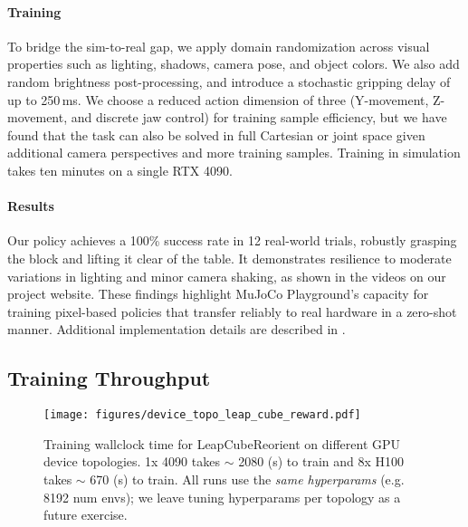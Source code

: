 \paragraph{Training}
To bridge the sim-to-real gap, we apply domain randomization across visual properties such as lighting, shadows, camera pose, and object colors. We also add random brightness post-processing, and introduce a stochastic gripping delay of up to 250\,ms.
We choose a reduced action dimension of three (Y-movement, Z-movement, and discrete jaw control) for training sample efficiency, but we have found that the task can also be solved in full Cartesian or joint space given additional camera perspectives and more training samples. Training in simulation takes ten minutes on a single RTX 4090.

\paragraph{Results}
Our policy achieves a 100\% success rate in 12 real-world trials, robustly grasping the block and lifting it clear of the table. It demonstrates resilience to moderate variations in lighting and minor camera shaking, as shown in the videos on our project website. These findings highlight MuJoCo Playground’s capacity for training pixel-based policies that transfer reliably to real hardware in a zero-shot manner. Additional implementation details are described in .

\subsection{Training Throughput}

\begin{figure}[t]
    \centering
    \texttt{[image: figures/device\_topo\_leap\_cube\_reward.pdf]}
    \caption{\small Training wallclock time for LeapCubeReorient on different GPU device topologies. 1x 4090 takes $\sim$ 2080 (s) to train and 8x H100 takes $\sim$ 670 (s) to train. All runs use the \emph{same hyperparams} (e.g. 8192 num envs); we leave tuning hyperparams per topology as a future exercise.}
    \label{fig:leap_cube_throughput}
\end{figure}

